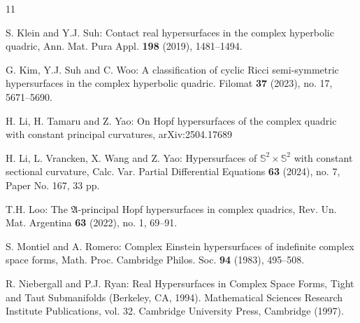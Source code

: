 \documentclass[reqno]{amsart}%
\theoremstyle{definition}
\numberwithin{equation}{section}
\begin{document}
\begin{thebibliography}{11}

S. Klein and Y.J. Suh:
Contact real hypersurfaces in the complex hyperbolic quadric,
Ann. Mat. Pura Appl. {\bf 198} (2019), 1481--1494.


G. Kim, Y.J. Suh and C. Woo:
A classification of cyclic Ricci semi-symmetric hypersurfaces in the complex hyperbolic quadric.
Filomat {\bf37} (2023), no. 17, 5671--5690.





H. Li, H. Tamaru and Z. Yao:
On Hopf hypersurfaces of the complex quadric with constant principal curvatures, 
arXiv:2504.17689


H. Li, L. Vrancken, X. Wang and Z. Yao:
Hypersurfaces of $\mathbb{S}^2\times \mathbb{S}^2$ with constant sectional curvature,
Calc. Var. Partial Differential Equations {\bf 63} (2024), no. 7, Paper No. 167, 33 pp.


T.H. Loo:
The $\mathfrak{A}$-principal Hopf hypersurfaces in complex quadrics,
Rev. Un. Mat. Argentina {\bf 63} (2022), no. 1, 69--91.

S. Montiel and A. Romero:
Complex Einstein hypersurfaces of indefinite complex space forms,
Math. Proc. Cambridge Philos. Soc. {\bf 94} (1983), 495--508.

R. Niebergall and P.J. Ryan:
Real Hypersurfaces in Complex Space Forms, Tight and Taut
Submanifolds (Berkeley, CA, 1994). Mathematical Sciences
Research Institute Publications, vol. 32. Cambridge University
Press, Cambridge (1997).




\end{thebibliography}
\end{document}
